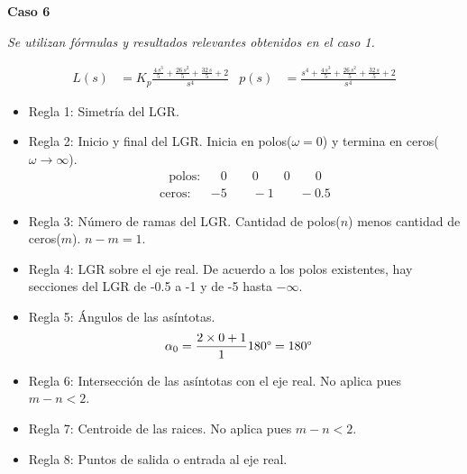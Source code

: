 \textbf{Caso 6}

\textit{Se utilizan fórmulas y resultados relevantes obtenidos en el caso 1.}

\begin{align*}
  L(s) &= K_p
  \frac{\frac{4\,s^3}{5}+\frac{26\,s^2}{5}+\frac{32\,s}{5}+2}{s^4}
  &
  p(s) &= 
  \frac{s^4+\frac{4\,s^3}{5}+\frac{26\,s^2}{5}+\frac{32\,s}{5}+2}{s^4}
\end{align*}
\begin{itemize}
  \item Regla 1: Simetría del LGR.
  \item Regla 2: Inicio y final del LGR. Inicia en polos($\omega = 0$) y termina en ceros($\omega \rightarrow \infty$).
  \begin{align*}
    \text{polos:} && 0 \qquad  0 \qquad  0 \qquad  0
  \end{align*}
  \begin{align*}
    \text{ceros:} && -5 \qquad -1 \qquad -0.5
  \end{align*}

  \item Regla 3: Número de ramas del LGR. Cantidad de polos($n$) menos cantidad de ceros($m$). $n-m = 1$.
  \item Regla 4: LGR sobre el eje real. 
  De acuerdo a los polos existentes, hay secciones del LGR de -0.5 a -1 y de -5 hasta $-\infty$.
  \item Regla 5: Ángulos de las asíntotas.
  \begin{align*}
    \alpha_0 &= \frac{2\times0 + 1}{1}  180\degree  = 180\degree
  \end{align*}
  \item Regla 6: Intersección de las asíntotas con el eje real. No aplica pues $m-n<2$.
  \item Regla 7: Centroide de las raices. No aplica pues $m-n<2$.
  \item Regla 8: Puntos de salida o entrada al eje real.


\end{itemize}
